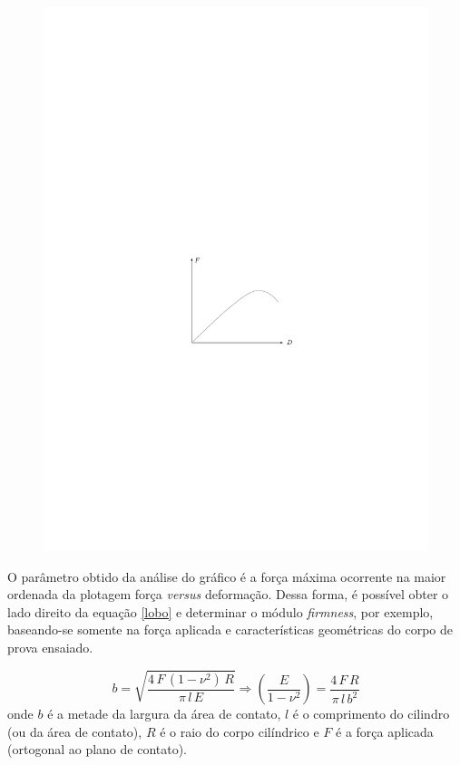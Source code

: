 \documentclass[a4paper, 12pt, brazilian]{article}
\begin{document}
\begin{itemize}
		\begin{figure}[H]
			\centering
			\includegraphics[scale=1.1]{images/brazilian}
		\end{figure}
	
		O parâmetro obtido da análise do gráfico é a força máxima ocorrente na maior ordenada da plotagem força \textit{versus} deformação. Dessa forma, é possível obter o lado direito da equação \eqref{lobo} e determinar o módulo \textit{firmness}, por exemplo, baseando-se somente na força aplicada e características geométricas do corpo de prova ensaiado.
	
		\begin{equation}
		\label{lobo}
		b=\sqrt{\dfrac{4\,F\,(1-\nu^{2})\,R}{\pi\,l\,E}}\Rightarrow \left(\dfrac{E}{1-\nu^{2}}\right)=\dfrac{4\,F\,R}{\pi\,l\,b^{2}}
		\end{equation}
		onde $b$ é a metade da largura da área de contato, $l$ é o comprimento do cilindro (ou da área de contato), $R$ é o raio do corpo cilíndrico e $F$ é a força aplicada (ortogonal ao plano de contato).
		

\end{itemize}
\end{document}
